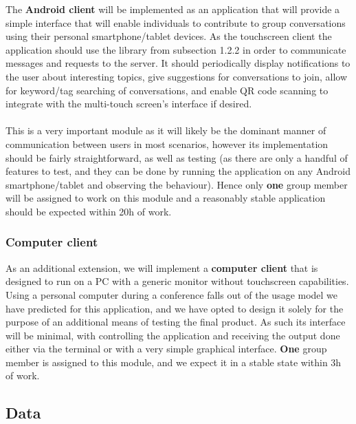 \documentclass[12p, a4paper, onecolumn]{report}
\begin{document}
The \textbf{Android client} will be implemented as an application that will provide a simple interface that will enable individuals to contribute to group conversations using their personal smartphone/tablet devices. As the touchscreen client the application should use the library from subsection 1.2.2 in order to communicate messages and requests to the server. It should periodically display notifications to the user about interesting topics, give suggestions for conversations to join, allow for keyword/tag searching of conversations, and enable QR code scanning to integrate with the multi-touch screen’s interface if desired. \\ \\
This is a very important module as it will likely be the dominant manner of communication between users in most scenarios, however its implementation should be fairly straightforward, as well as testing (as there are only a handful of features to test, and they can be done by running the application on any Android smartphone/tablet and observing the behaviour). Hence only \textbf{one} group member will be assigned to work on this module and a reasonably stable application should be expected within 20h of work.

\subsubsection{Computer client}

As an additional extension, we will implement a \textbf{computer client} that is designed to run on a PC with a generic monitor without touchscreen capabilities. Using a personal computer during a conference falls out of the usage model we have predicted for this application, and we have opted to design it solely for the purpose of an additional means of testing the final product. As such its interface will be minimal, with controlling the application and receiving the output done either via the terminal or with a very simple graphical interface. \textbf{One} group member is assigned to this module, and we expect it in a stable state within 3h of work.

\subsection{Data}
\end{document}
